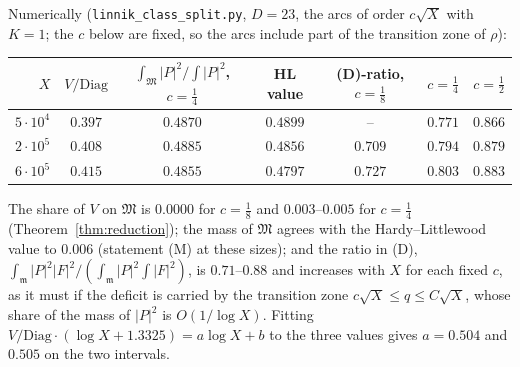 ﻿\documentclass[11pt]{amsart}
\theoremstyle{remark}
\begin{document}
Numerically (\texttt{linnik\_class\_split.py}, $D=23$, the arcs of order $c\sqrt X$ with $K=1$; the $c$ below are fixed, so the arcs include part of the transition zone of $\rho$):
\begin{center}\footnotesize
\begin{tabular}{r|c|cc|ccc}
\toprule
$X$ & $V/\mathrm{Diag}$ & $\int_{\mathfrak M}|P|^2/\int|P|^2$, $c=\frac14$ & HL value & (D)-ratio, $c=\frac18$ & $c=\frac14$ & $c=\frac12$\\
\midrule
$5\cdot10^4$ & $0.397$ & $0.4870$ & $0.4899$ & -- & $0.771$ & $0.866$\\
$2\cdot10^5$ & $0.408$ & $0.4885$ & $0.4856$ & $0.709$ & $0.794$ & $0.879$\\
$6\cdot10^5$ & $0.415$ & $0.4855$ & $0.4797$ & $0.727$ & $0.803$ & $0.883$\\
\bottomrule
\end{tabular}
\end{center}
The share of $V$ on $\mathfrak M$ is $0.0000$ for $c=\frac18$ and $0.003$--$0.005$ for $c=\frac14$ (Theorem~\ref{thm:reduction}); the mass of $\mathfrak M$ agrees with the Hardy--Littlewood value to $0.006$ (statement (M) at these sizes); and the ratio in (D), $\int_{\mathfrak m}|P|^2|F|^2/(\int_{\mathfrak m}|P|^2\int|F|^2)$, is $0.71$--$0.88$ and increases with $X$ for each fixed $c$, as it must if the deficit is carried by the transition zone $c\sqrt X\le q\le C\sqrt X$, whose share of the mass of $|P|^2$ is $O(1/\log X)$. Fitting $V/\mathrm{Diag}\cdot(\log X+1.3325)=a\log X+b$ to the three values gives $a=0.504$ and $0.505$ on the two intervals.
\end{document}
